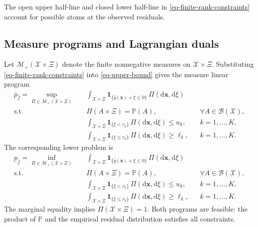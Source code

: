 \documentclass[review,11pt,3p,authoryear,nopreprintline]{elsarticle}
\begin{document}
The open upper half-line and closed lower half-line in \eqref{eq-finite-rank-constraints} account for possible atoms at the observed residuals.

\subsection{Measure programs and Lagrangian duals}
\label{subsec-measure-duals}

Let $\mathcal M_+(\mathcal X\times\Xi)$ denote the finite nonnegative measures on $\mathcal X\times\Xi$. Substituting \eqref{eq-finite-rank-constraints} into \eqref{eq-upper-bound} gives the measure linear program
\begin{equation}
  \begin{aligned}
    \overline p_{\hat f}
    =\sup_{\Pi\in\mathcal M_+(\mathcal X\times\Xi)}\quad&
    \int_{\mathcal X\times\Xi}
    \mathbf1_{\{\hat g(\bm x)+\xi\le0\}}\,\Pi(\mathrm d\bm x,\mathrm d\xi)\\
    \text{s.t.}\quad&
    \Pi(A\times\Xi)=\mathbb P(A),
    &&\forall A\in\mathcal B(\mathcal X),\\
    &\int_{\mathcal X\times\Xi}
    \mathbf1_{\{\xi<r_k\}}\,\Pi(\mathrm d\bm x,\mathrm d\xi)\le u_k,
    &&k=1,\ldots,K,\\
    &\int_{\mathcal X\times\Xi}
    \mathbf1_{\{\xi\le r_k\}}\,\Pi(\mathrm d\bm x,\mathrm d\xi)\ge\ell_k,
    &&k=1,\ldots,K.
  \end{aligned}
  \label{eq-measure-upper}
\end{equation}
The corresponding lower problem is
\begin{equation}
  \begin{aligned}
    \underline p_{\hat f}
    =\inf_{\Pi\in\mathcal M_+(\mathcal X\times\Xi)}\quad&
    \int_{\mathcal X\times\Xi}
    \mathbf1_{\{\hat g(\bm x)+\xi\le0\}}\,\Pi(\mathrm d\bm x,\mathrm d\xi)\\
    \text{s.t.}\quad&
    \Pi(A\times\Xi)=\mathbb P(A),
    &&\forall A\in\mathcal B(\mathcal X),\\
    &\int_{\mathcal X\times\Xi}
    \mathbf1_{\{\xi<r_k\}}\,\Pi(\mathrm d\bm x,\mathrm d\xi)\le u_k,
    &&k=1,\ldots,K,\\
    &\int_{\mathcal X\times\Xi}
    \mathbf1_{\{\xi\le r_k\}}\,\Pi(\mathrm d\bm x,\mathrm d\xi)\ge\ell_k,
    &&k=1,\ldots,K.
  \end{aligned}
  \label{eq-measure-lower}
\end{equation}
The marginal equality implies $\Pi(\mathcal X\times\Xi)=1$. Both programs are feasible: the product of $\mathbb P$ and the empirical residual distribution satisfies all constraints.
\end{document}
